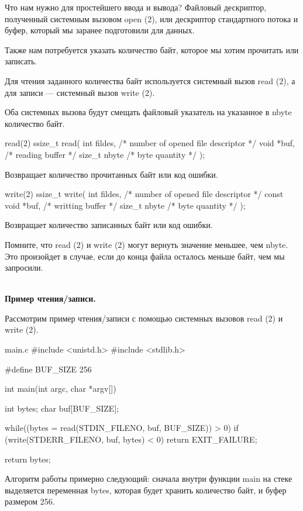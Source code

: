 Что нам нужно для простейшего ввода и вывода? Файловый дескриптор, полученный системным вызовом open (2), или дескриптор стандартного потока и буфер, который мы заранее подготовили для данных.

Также нам потребуется указать количество байт, которое мы хотим прочитать или записать.

Для чтения заданного количества байт используется системный вызов read (2), а для записи --- системный вызов write (2). 

\begin{important}
	Оба системных вызова будут смещать файловый указатель на указанное в nbyte количество байт.
\end{important}

\begin{CCode}{read(2)}
	ssize_t read(
		int fildes,	 	/* number of opened file descriptor */ 
		void *buf,	 	/* reading buffer */ 
		size_t nbyte 	/* byte quantity */ 
	); \end{CCode}
Возвращает количество прочитанных байт или код ошибки.

\begin{CCode}{write(2)}
	ssize_t write( 
		int fildes,			 /* number of opened file descriptor */
		const void *buf, 	 /* writting buffer */
		size_t nbyte		 /* byte quantity */
 	); \end{CCode}
Возвращает количество записанных байт или код ошибки.

Помните, что read (2) и write (2) могут вернуть значение меньшее, чем nbyte. Это произойдет в случае, если до конца файла осталось меньше байт, чем мы запросили.

\\
\textbf{Пример чтения/записи.}

Рассмотрим пример чтения/записи с помощью системных вызовов read (2) и write (2).

\begin{CCode}{main.c}	
	#include <unistd.h>
	#include <stdlib.h>

	#define BUF_SIZE 256
	
 	int main(int argc, char *argv[]) { 
		int bytes; 
		char buf[BUF_SIZE];
 
		while((bytes = read(STDIN_FILENO, buf, BUF_SIZE)) > 0) 
			if (write(STDERR_FILENO, buf, bytes) < 0) 
				return EXIT_FAILURE;
		
		return bytes; 
} \end{CCode}

Алгоритм работы примерно следующий: сначала внутри функции main на стеке выделяется переменная bytes, которая  будет хранить количество байт, и буфер размером 256. 

